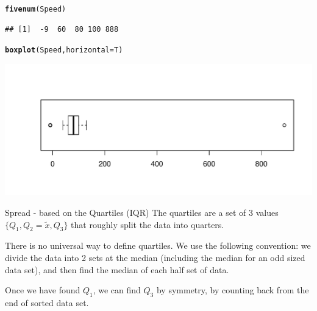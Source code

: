 \documentclass[t,xcolor=pdftex,dvipsnames,table]{beamer}\usepackage[]{graphicx}\usepackage[]{color}
\makeatletter
\def\maxwidth{ %
  \ifdim\Gin@nat@width>\linewidth
    \linewidth
  \else
    \Gin@nat@width
  \fi
}
\newcommand{\hlstd}[1]{\textcolor[rgb]{0.345,0.345,0.345}{#1}}%
\newcommand{\hlkwc}[1]{\textcolor[rgb]{0.333,0.667,0.333}{#1}}%
\newcommand{\hlkwd}[1]{\textcolor[rgb]{0.737,0.353,0.396}{\textbf{#1}}}%
\newenvironment{kframe}{%
 \def\at@end@of@kframe{}%
 \ifinner\ifhmode%
  \def\at@end@of@kframe{\end{minipage}}%
  \begin{minipage}{\columnwidth}%
 \fi\fi%
 \def\FrameCommand##1{\hskip\@totalleftmargin \hskip-\fboxsep
 \colorbox{shadecolor}{##1}\hskip-\fboxsep
     \hskip-\linewidth \hskip-\@totalleftmargin \hskip\columnwidth}%
 \MakeFramed {\advance\hsize-\width
   \@totalleftmargin\z@ \linewidth\hsize
   \@setminipage}}%
 {\par\unskip\endMakeFramed%
 \at@end@of@kframe}
\newenvironment{knitrout}{}{} %
\makeatother
\begin{document}
\begin{frame}[fragile]{}
\begin{knitrout}
\color{fgcolor}\begin{kframe}
\begin{alltt}
\hlkwd{fivenum}\hlstd{(Speed)}
\end{alltt}
\begin{verbatim}
## [1]  -9  60  80 100 888
\end{verbatim}
\begin{alltt}
\hlkwd{boxplot}\hlstd{(Speed,} \hlkwc{horizontal}\hlstd{=T)}
\end{alltt}
\end{kframe}
\includegraphics[width=\maxwidth]{figure/unnamed-chunk-32-1} 

\end{knitrout}
\end{frame}
 
 
 
 
\begin{frame}[fragile,label=Quartiles]{Spread - based on the Quartiles (IQR)}
The quartiles are a set of 3 values $\{ Q_{1}, Q_{2} = \tilde{x}, Q_{3} \}$ that roughly split the data into quarters.

\vspace{.5cm}
There is no universal way to define quartiles.  
We use the following convention: we divide the data into 2 sets at the median (including the median for an odd sized data set), and then find the median of each half set of data.

\vspace{.5cm}
Once we have found $Q_{1}$, we can find $Q_{3}$ by symmetry, by counting back from the end of sorted data set.
\end{frame}
\end{document}

